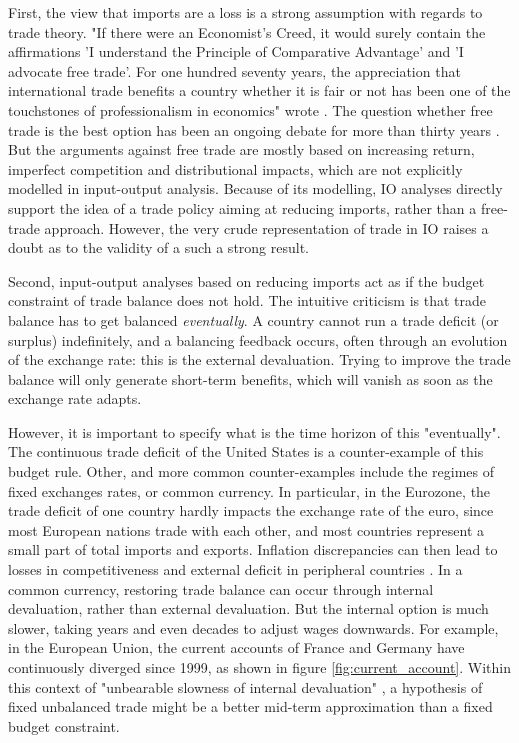First, the view that imports are a loss is a strong assumption with regards to trade theory. "If there were an Economist's Creed, it would surely contain the affirmations 'I understand the Principle of Comparative Advantage' and 'I advocate free trade'. For one hundred seventy years, the appreciation that international trade benefits a country whether it is fair or not has been one of the touchstones of professionalism in economics" wrote \citet{Krugman1987}.
The question whether free trade is the best option has been an ongoing debate for more than thirty years \citep{Krugman1987}. But the arguments against free trade are mostly based on increasing return, imperfect competition and distributional impacts, which are not explicitly modelled in input-output analysis. 
Because of its modelling, IO analyses directly support the idea of a trade policy aiming at reducing imports, rather than a free-trade approach. However, the very crude representation of trade in IO raises a doubt as to the validity of a such a strong result.

Second, input-output analyses based on reducing imports act as if the budget constraint of trade balance does not hold.
The intuitive criticism is that trade balance has to get balanced \textit{eventually}. A country cannot run a trade deficit (or surplus) indefinitely, and a balancing feedback occurs, often through an evolution of the exchange rate: this is the external devaluation. 
Trying to improve the trade balance will only generate short-term benefits, which will vanish as soon as the exchange rate adapts.

However, it is important to specify what is the time horizon of this "eventually". 
The continuous trade deficit of the United States is a counter-example of this budget rule. Other, and more common counter-examples include the regimes of fixed exchanges rates, or common currency.
In particular, in the Eurozone, the trade deficit of one country hardly impacts the exchange rate of the euro, since most European nations trade with each other, and most countries represent a small part of total imports and exports. Inflation discrepancies can then lead to losses in competitiveness and external deficit in peripheral countries \citep{Coudert2013}. In a common currency, restoring trade balance can occur through internal devaluation, rather than external devaluation. But the internal option is much slower, taking years and even decades to adjust wages downwards. For example, in the European Union, the current accounts of France and Germany have continuously diverged since 1999, as shown in figure \ref{fig:current_account}.
Within this context of "unbearable slowness of internal devaluation" \citep{Krugman2012}, a hypothesis of fixed unbalanced trade might be a better mid-term approximation than a fixed budget constraint.

